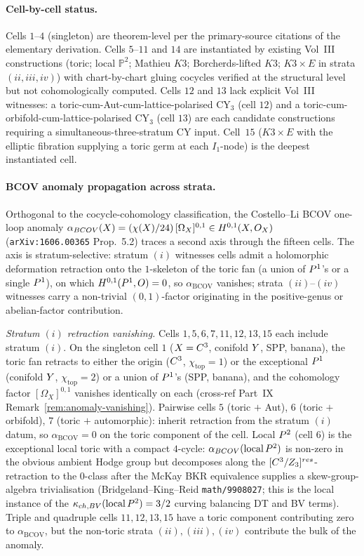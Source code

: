 \paragraph{Cell-by-cell status.} Cells $1$--$4$ (singleton) are
theorem-level per the primary-source citations of the elementary
derivation. Cells $5$--$11$ and $14$ are instantiated by existing
Vol~III constructions (toric; local $\mathbb{P}^{2}$; Mathieu $K3$;
Borcherds-lifted $K3$; $K3\times E$ in strata $(ii, iii, iv)$) with
chart-by-chart gluing cocycles verified at the structural level but
not cohomologically computed. Cells $12$ and $13$ lack explicit
Vol~III witnesses: a toric-cum-Aut-cum-lattice-polarised CY$_{3}$
(cell $12$) and a toric-cum-orbifold-cum-lattice-polarised CY$_{3}$
(cell $13$) are each candidate constructions requiring a
simultaneous-three-stratum CY input. Cell~$15$ ($K3\times E$ with
the elliptic fibration supplying a toric germ at each $I_{1}$-node)
is the deepest instantiated cell.

\paragraph{BCOV anomaly propagation across strata.} Orthogonal to the
cocycle-cohomology classification, the Costello--Li BCOV one-loop
anomaly $\alpha_{BCOV}(X) = (\chi(X)/24)\,
[\Omega_{X}]^{0,1}\in H^{0,1}(X,O_{X})$ (\texttt{arXiv:1606.00365}
Prop.~5.2) traces a second axis through the fifteen cells. The axis
is stratum-selective: stratum $(i)$ witnesses cells admit a
holomorphic deformation retraction onto the $1$-skeleton of the
toric fan (a union of $P^{1}$'s or a single $P^{1}$), on which
$H^{0,1}(P^{1},O)=0$, so $\alpha_{\mathrm{BCOV}}$ vanishes; strata
$(ii)$--$(iv)$ witnesses carry a non-trivial $(0,1)$-factor
originating in the positive-genus or abelian-factor contribution.

\emph{Stratum $(i)$ retraction vanishing.} Cells $1, 5, 6, 7, 11, 12,
13, 15$ each include stratum $(i)$. On the singleton cell $1$ ($X =
C^{3}$, conifold $Y$, SPP, banana), the toric fan retracts to
either the origin ($C^{3}$, $\chi_{\mathrm{top}}=1$) or the
exceptional $P^{1}$ (conifold $Y$, $\chi_{\mathrm{top}}=2$) or a
union of $P^{1}$'s (SPP, banana), and the cohomology factor
$[\Omega_{X}]^{0,1}$ vanishes identically on each (cross-ref
Part~IX Remark~\ref{rem:anomaly-vanishing}). Pairwise cells $5$ (toric
$+$ Aut), $6$ (toric $+$ orbifold), $7$ (toric $+$ automorphic):
inherit retraction from the stratum $(i)$ datum, so
$\alpha_{\mathrm{BCOV}}=0$ on the toric component of the cell. Local
$P^{2}$ (cell $6$) is the exceptional local toric with a compact
$4$-cycle: $\alpha_{BCOV}(\text{local}\,P^{2})$ is
non-zero in the obvious ambient Hodge group but decomposes along the
$[C^{3}/Z_{3}]^{res}$-retraction to the $0$-class after the
McKay BKR equivalence supplies a skew-group-algebra trivialisation
(Bridgeland--King--Reid \texttt{math/9908027}; this is the local
instance of the $\kappa_{ch,BV}(\text{local}\,P^{2}) = 3/2$
curving balancing DT and BV terms). Triple and quadruple cells $11,
12, 13, 15$ have a toric component contributing zero to
$\alpha_{\mathrm{BCOV}}$, but the non-toric strata $(ii), (iii), (iv)$
contribute the bulk of the anomaly.

